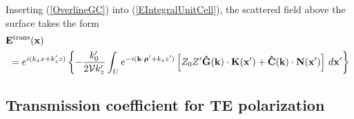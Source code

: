 \documentclass[letterpaper]{article}
\begin{document}
Inserting (\ref{OverlineGC}) into (\ref{EIntegralUnitCell}), 
the scattered field above the surface takes the form
\begin{align}
 &\hspace{-0.05in} \vb E\sups{trans}(\vb x)
\nn
&=
 e^{i(k_x x + k_z^\prime z)}
        \left\{ -\frac{k_0^\prime}{2\mc V k_z^\prime}
        \int_U e^{-i(\vb k \cdot \vbrho^\prime + k_z z^\prime)}
        \left[ Z_0 Z^\prime \vbhat{G}(\vb k)\cdot \vb K(\vb x^\prime)
                +\vbhat{C}(\vb k)\cdot \vb N(\vb x^\prime)
        \right] \, d\vb x^\prime
        \right\}
\label{ETransSurfaceIntegral}
\end{align}

\subsection*{Transmission coefficient for TE polarization}
\end{document}
